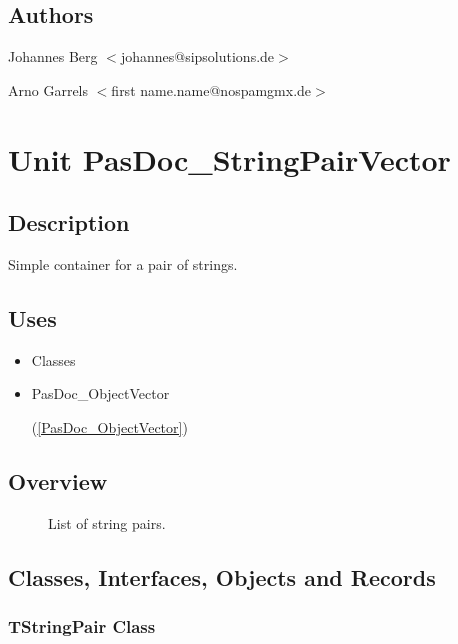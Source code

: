 \documentclass{report}
\newif\ifpdf
\begin{document}
\section{Authors}
\par
Johannes Berg {$<$}johannes@sipsolutions.de{$>$}

\par
Arno Garrels {$<$}first name.name@nospamgmx.de{$>$}

\chapter{Unit PasDoc{\_}StringPairVector}
\label{PasDoc_StringPairVector}
\section{Description}
Simple container for a pair of strings.
\section{Uses}
\begin{itemize}
\item \begin{ttfamily}Classes\end{ttfamily}\item \begin{ttfamily}PasDoc{\_}ObjectVector\end{ttfamily}(\ref{PasDoc_ObjectVector})\end{itemize}
\section{Overview}
\begin{description}
\item[\texttt{\begin{ttfamily}TStringPair\end{ttfamily} Class}]
\item[\texttt{\begin{ttfamily}TStringPairVector\end{ttfamily} Class}]List of string pairs.
\end{description}
\section{Classes, Interfaces, Objects and Records}
\ifpdf
\subsection*{\large{\textbf{TStringPair Class}}\normalsize\hspace{1ex}\hrulefill}
\else
\end{document}
